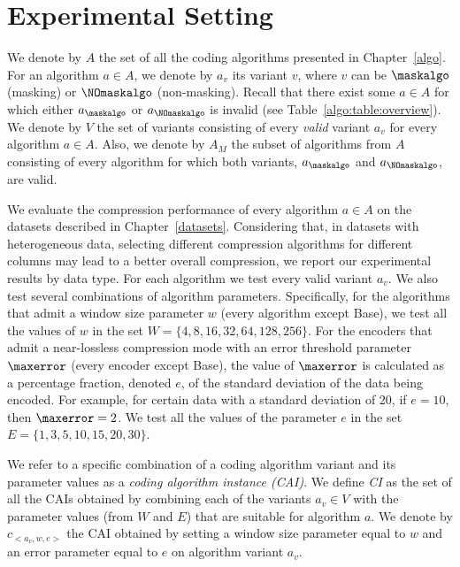 
\clearpage
\section{Experimental Setting}
\label{experiments:experiments}


We denote by $A$ the set of all the coding algorithms presented in Chapter~\ref{algo}. For an algorithm $a \in A$, we denote by $a_v$ its variant $v$, where $v$ can be $\maskalgo$ (masking) or $\NOmaskalgo$ (non-masking). Recall that there exist some $a \in A$ for which either $a_\maskalgo$ or $a_\NOmaskalgo$ is invalid (see Table~\ref{algo:table:overview}). We denote by $V$ the set of variants consisting of every \textit{valid} variant $a_v$ for every algorithm $a \in A$. Also, we denote by $A_M$ the subset of algorithms from $A$ consisting of every algorithm for which both variants, $a_\maskalgo$ and $a_\NOmaskalgo$, are valid.


We evaluate the compression performance of every algorithm $a \in A$ on the datasets described in Chapter~\ref{datasets}. Considering that, in datasets with heterogeneous data, selecting different compression algorithms for different columns may lead to a better overall compression, we report our experimental results by data type. For each algorithm we test every valid variant $a_v$. We also test several combinations of algorithm parameters. Specifically, for the algorithms that admit a window size parameter $w$ (every algorithm except Base), we test all the values of $w$ in the set $W = \{4, 8, 16, 32, 64, 128, 256\}$. For the encoders that admit a near-lossless compression mode with an error threshold parameter~$\maxerror$ (every encoder except Base), the value of $\maxerror$ is calculated as a percentage fraction, denoted $e$, of the standard deviation of the data being encoded. For example, for certain data with a standard deviation of 20, if $e=10$, then $\maxerror=2$. We test all the values of the parameter $e$ in the set $E= \{1, 3, 5, 10, 15, 20, 30\}$. 


\vspace{+5pt}
\begin{defcion}
We refer to a specific combination of a coding algorithm variant and its parameter values as a \textit{coding algorithm instance (CAI)}. We define \textit{CI} as the set of all the CAIs obtained by combining each of the variants $a_v \in V$ with the parameter values (from $W$ and $E$) that are suitable for algorithm $a$. We denote by $c_{<a_v, w, e>}$ the CAI obtained by setting a window size parameter equal to $w$ and an error parameter equal to $e$ on algorithm variant $a_v$.
\end{defcion}


